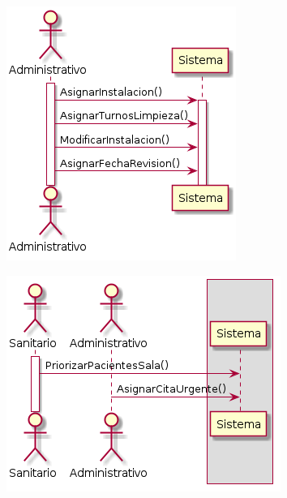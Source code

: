 \documentclass[10pt,a4paper,spanish]{report}
\begin{document}
\begin{center}
\includegraphics[scale=0.50]{gestion-instalaciones.png}

\vspace{0.5cm}

\includegraphics[scale=0.50]{gestion-urgencias.png}

\vspace{0.5cm}


\end{center}
\end{document}

